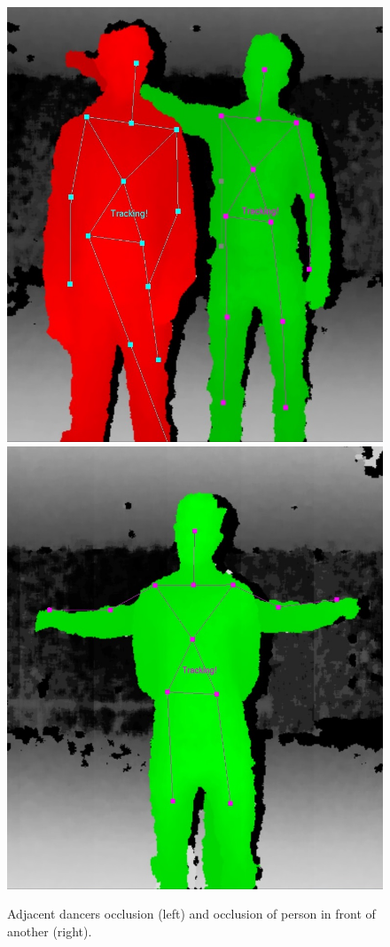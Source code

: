 \documentclass[11pt,a4paper]{article}
\begin{document}
\begin{figure}[H]
\center
\includegraphics[scale=0.2]{Occlusion1.jpg} 
\includegraphics[scale=0.1822]{Occlusion2.jpg} 
\caption{Adjacent dancers occlusion (left) and occlusion of person in front of another (right).}
\label{occlusion1}
\end{figure} 
\end{document}
